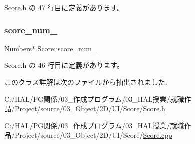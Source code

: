  Score.\+h の 47 行目に定義があります。

\mbox{\label{class_score_a5d178c5581627f1fa4c06f95f9558dcd}} 
\subsubsection{\texorpdfstring{score\+\_\+num\+\_\+}{score\_num\_}}
{\footnotesize\ttfamily \mbox{\hyperlink{class_numbers}{Numbers}}$\ast$ Score\+::score\+\_\+num\+\_\+}



 Score.\+h の 46 行目に定義があります。



このクラス詳解は次のファイルから抽出されました\+:\begin{DoxyCompactItemize}
\item 
C\+:/\+H\+A\+L/\+P\+G関係/03\+\_\+作成プログラム/03\+\_\+\+H\+A\+L授業/就職作品/\+Project/source/03\+\_\+\+Object/2\+D/\+U\+I/\+Score/\mbox{\hyperlink{_score_8h}{Score.\+h}}\item 
C\+:/\+H\+A\+L/\+P\+G関係/03\+\_\+作成プログラム/03\+\_\+\+H\+A\+L授業/就職作品/\+Project/source/03\+\_\+\+Object/2\+D/\+U\+I/\+Score/\mbox{\hyperlink{_score_8cpp}{Score.\+cpp}}\end{DoxyCompactItemize}
